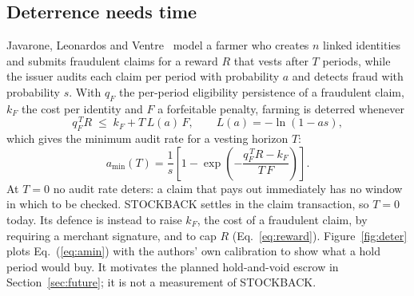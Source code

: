 \documentclass[10.5pt,letterpaper]{article}
\theoremstyle{definition}
\theoremstyle{remark}
\begin{document}
\subsection{Deterrence needs time}
Javarone, Leonardos and Ventre~\cite{javarone2026nft} model a farmer who creates $n$ linked identities and submits fraudulent claims for a
reward $R$ that vests after $T$ periods, while the issuer audits each claim per period with probability $a$ and detects fraud
with probability $s$. With $q_F$ the per-period eligibility persistence of a fraudulent claim, $k_F$ the cost per identity and $F$ a
forfeitable penalty, farming is deterred whenever
\begin{equation}\label{eq:deter}
q_F^{\,T} R \;\le\; k_F + T\,L(a)\,F,\qquad L(a) = -\ln(1-as),
\end{equation}
which gives the minimum audit rate for a vesting horizon $T$:
\begin{equation}\label{eq:amin}
a_{\min}(T) = \frac{1}{s}\left[1-\exp\!\left(-\frac{q_F^{\,T}R-k_F}{T\,F}\right)\right].
\end{equation}
At $T=0$ no audit rate deters: a claim that pays out immediately has no window in which to be checked. STOCKBACK settles in the
claim transaction, so $T=0$ today. Its defence is instead to raise $k_F$, the cost of a fraudulent claim, by requiring a merchant
signature, and to cap $R$ (Eq.~\ref{eq:reward}). Figure~\ref{fig:deter} plots Eq.~(\ref{eq:amin}) with the authors' own calibration to show what
a hold period would buy. It motivates the planned hold-and-void escrow in Section~\ref{sec:future}; it is not a measurement of STOCKBACK.
\end{document}
